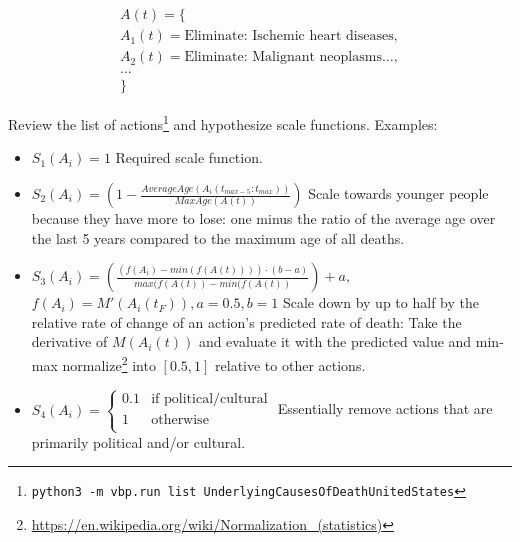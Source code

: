 \documentclass[12pt, a4paper, twocolumn]{article}
\begin{document}
\begin{equation*}
  \begin{gathered}
    A(t) = \{\\
    A_1(t) = \textrm{Eliminate: Ischemic heart diseases},\\
    A_2(t) = \textrm{Eliminate: Malignant neoplasms\ldots},\\
    \textrm{\ldots}\\
    \}
  \end{gathered}
\end{equation*}

Review the list of actions\footnote{\texttt{python3 -m vbp.run list UnderlyingCausesOfDeathUnitedStates}} and hypothesize scale functions. Examples:

\begin{itemize}
  \item $S_1(A_i) = 1$
                  \newline\newline
                  Required scale function.
  \item $S_2(A_i) = \left(1 - \frac{AverageAge(A_i(t_{max-5}:t_{max}))}{MaxAge(A(t))}\right)$
                  \newline\newline
                  Scale towards younger people because they have more to lose: one minus the ratio of the average age\cite{nbermortality} over the last 5 years compared to the maximum age of all deaths.
  \item $S_3(A_i) = \left(\frac{(f(A_i)-min(f(A(t)))) \cdot (b-a)}{max(f(A(t))-min(f(A(t))}\right) + a,$
                  \newline\newline
                  $f(A_i) = M'(A_i(t_F)), a=0.5, b=1$
                  \newline\newline
                  Scale down by up to half by the relative rate of change of an action's predicted rate of death: Take the derivative of $M(A_i(t))$ and evaluate it with the predicted value and min-max normalize\footnote{\scriptsize{\url{https://en.wikipedia.org/wiki/Normalization_(statistics)}}} into $[0.5,1]$ relative to other actions.
  \item $S_4(A_i) = \begin{cases}\text{0.1} & \mbox{if political/cultural} \\ \text{1} & \mbox{otherwise} \\ \end{cases}$
                  \newline\newline
                  Essentially remove actions that are primarily political and/or cultural.
\end{itemize}
\end{document}
